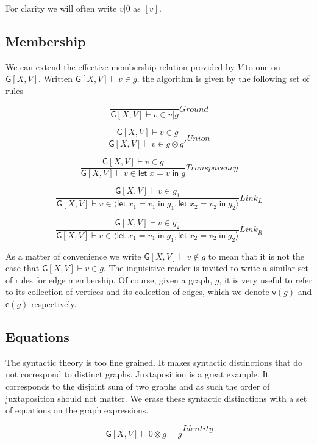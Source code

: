 \documentclass[12pt]{llncs}
\begin{document}
For clarity we will often write \(v|0\) as \([v]\).

\hypertarget{membership}{%
\subsection{Membership}\label{membership}}

We can extend the effective membership relation provided by \(V\) to one
on \(\mathsf{G}[X,V]\). Written \(\mathsf{G}[X,V] \vdash v \in g\), the
algorithm is given by the following set of rules

\[\frac{ }{ \mathsf{G}[X,V] \vdash v \in v | g}Ground\]

\[\frac{ \mathsf{G}[X,V] \vdash v \in g }{ \mathsf{G}[X,V] \vdash v \in g \otimes g'}Union\]

\[\frac{ \mathsf{G}[X,V] \vdash v \in g }{ \mathsf{G}[X,V] \vdash v \in \mathsf{let}\; x = v \; \mathsf{in}\; g}Transparency\]

\[\frac{ \mathsf{G}[X,V] \vdash v \in g_1 }{ \mathsf{G}[X,V] \vdash v \in \langle\mathsf{let}\; x_1 = v_1 \; \mathsf{in}\; g_1, \mathsf{let}\; x_2 = v_2 \; \mathsf{in}\; g_2\rangle}Link_L\]

\[\frac{ \mathsf{G}[X,V] \vdash v \in g_2 }{ \mathsf{G}[X,V] \vdash v \in \langle\mathsf{let}\; x_1 = v_1 \; \mathsf{in}\; g_1, \mathsf{let}\; x_2 = v_2 \; \mathsf{in}\; g_2\rangle}Link_R\]

As a matter of convenience we write
\(\mathsf{G}[X,V] \vdash v \not\in g\) to mean that it is not the case
that \(\mathsf{G}[X,V] \vdash v \in g\). The inquisitive reader is
invited to write a similar set of rules for edge membership. Of course,
given a graph, \(g\), it is very useful to refer to its collection of
vertices and its collection of edges, which we denote \(\mathsf{v}(g)\)
and \(\mathsf{e}(g)\) respectively.

\hypertarget{equations}{%
\subsection{Equations}\label{equations}}

The syntactic theory is too fine grained. It makes syntactic
distinctions that do not correspond to distinct graphs. Juxtaposition is
a great example. It corresponds to the disjoint sum of two graphs and as
such the order of juxtaposition should not matter. We erase these
syntactic distinctions with a set of equations on the graph expressions.

\[\frac{ }{ \mathsf{G}[X,V] \vdash 0 \otimes g = g}Identity\]
\end{document}
